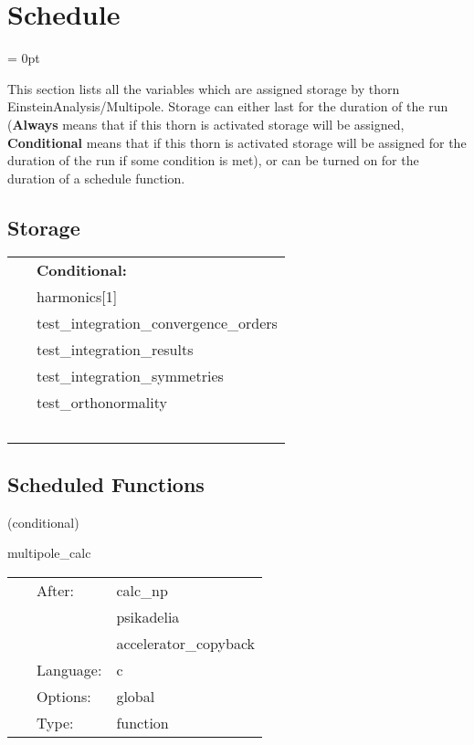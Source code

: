 
\section{Schedule} 


\parskip = 0pt


\noindent This section lists all the variables which are assigned storage by thorn EinsteinAnalysis/Multipole.  Storage can either last for the duration of the run ({\bf Always} means that if this thorn is activated storage will be assigned, {\bf Conditional} means that if this thorn is activated storage will be assigned for the duration of the run if some condition is met), or can be turned on for the duration of a schedule function.


\subsection*{Storage}

\hspace{5mm}

 \begin{tabular*}{160mm}{ll} 
~& {\bf Conditional:} \\ 
~ &  harmonics[1]\\ 
~ &  test\_integration\_convergence\_orders\\ 
~ &  test\_integration\_results\\ 
~ &  test\_integration\_symmetries\\ 
~ &  test\_orthonormality\\ 
~ & ~\\ 
\end{tabular*} 


\subsection*{Scheduled Functions}
\vspace{5mm}

   (conditional) 

\hspace{5mm} multipole\_calc 

\hspace{5mm}{\it calculate multipoles } 


\hspace{5mm}

 \begin{tabular*}{160mm}{cll} 
~ & After:  & calc\_np \\ 
~& ~ &psikadelia\\ 
~& ~ &accelerator\_copyback\\ 
~ & Language:  & c \\ 
~ & Options:  & global \\ 
~ & Type:  & function \\ 
\end{tabular*} 


